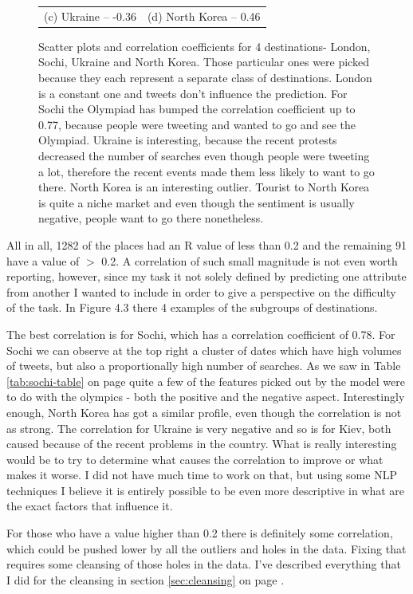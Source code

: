 \documentclass[minf,frontabs,twoside,singlespacing,parskip]{infthesis}
\begin{document}
\begin{figure}[p!]
\begin{tabular}{cc}
(c) Ukraine -- -0.36 & (d) North Korea -- 0.46 \\[6pt]
\end{tabular}
\caption{Scatter plots and correlation coefficients for 4 destinations- London, Sochi, Ukraine and North Korea. Those particular ones were picked because they each represent a separate class of destinations. London is a constant one and tweets don't influence the prediction. For Sochi the Olympiad has bumped the correlation coefficient up to 0.77, because people were tweeting and wanted to go and see the Olympiad. Ukraine is interesting, because the recent protests decreased the number of searches even though people were tweeting a lot, therefore the recent events made them less likely to want to go there. North Korea is an interesting outlier. Tourist to North Korea is quite a niche market and even though the sentiment is usually negative, people want to go there nonetheless. }
\end{figure}


All in all, 1282 of the places had an R value of less than 0.2 and the remaining 91 have a value of $>$ 0.2. A correlation of such small magnitude is not even worth reporting, however, since my task it not solely defined by predicting one attribute from another I wanted to include in order to give a perspective on the difficulty of the task. In Figure 4.3 there 4 examples of the subgroups of destinations. 


The best correlation is for Sochi, which has a correlation coefficient of 0.78. For Sochi we can observe at the top right a cluster of dates which have high volumes of tweets, but also a proportionally high number of searches. As we saw in Table \ref{tab:sochi-table} on page \pageref{tab:sochi-table} quite a few of the features picked out by the model were to do with the olympics - both the positive and the negative aspect. Interestingly enough, North Korea has got a similar profile, even though the correlation is not as strong. The correlation for Ukraine is very negative and so is for Kiev, both caused because of the recent problems in the country. What is really interesting would be to try to determine what causes the correlation to improve or what makes it worse. I did not have much time to work on that, but using some NLP techniques I believe it is entirely possible to be even more descriptive in what are the exact factors that influence it.


For those who have a value higher than 0.2 there is definitely some correlation, which could be pushed lower by all the outliers and holes in the data. Fixing that requires some cleansing of those holes in the data. I've described everything that I did for the cleansing in section \ref{sec:cleansing} on page \pageref{sec:cleansing}.
\end{document}
